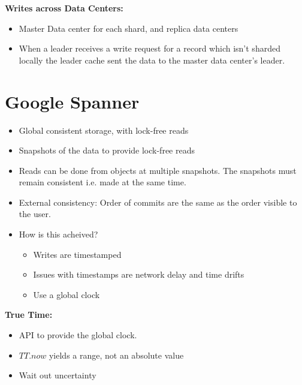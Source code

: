 \documentclass[parskip=half]{scrartcl}
\begin{document}
    \textbf{Writes across Data Centers:}
    \begin{itemize}
        \item 
        Master Data center for each shard, and replica data centers
        \item 
        When a leader receives a write request for a record which isn't sharded locally the leader cache sent the data to the master data center's leader.
    \end{itemize}



\section{Google Spanner} %
\label{sec:google_spanner}

    \begin{itemize}
        \item 
        Global consistent storage, with lock-free reads
        \item 
        Snapshots of the data to provide lock-free reads        
        \item 
        Reads can be done from objects at multiple snapshots. The snapshots must remain consistent i.e. made at the same time.
        \item 
        External consistency: Order of commits are the same as the order visible to the user.
        \item 
        How is this acheived?
        \begin{itemize}
            \item 
            Writes are timestamped
            \item 
            Issues with timestamps are network delay and time drifts
            \item 
            Use a global clock
        \end{itemize}
    \end{itemize}

    \textbf{True Time:}
    \begin{itemize}
        \item 
        API to provide the global clock.
        \item 
        $TT.now$ yields a range, not an absolute value
        \item 
        Wait out uncertainty
    \end{itemize}


\end{document}

